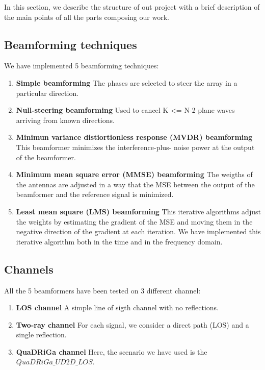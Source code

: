 In this section, we describe the structure of out project with a brief description of 
the main points of all the parts composing our work.

\subsection{Beamforming techniques}

We have implemented 5 beamforming techniques:

\begin{enumerate}
    \item \textbf{Simple beamforming} The phases are selected to steer the array in a particular direction.
    \item \textbf{Null-steering beamforming} Used to cancel K <= N-2 plane waves arriving from known directions.
    \item \textbf{Minimun variance distiortionless response (MVDR) beamforming} This beamformer minimizes the interference-plus-
            noise power at the output of the beamformer. 
    \item \textbf{Minimum mean square error (MMSE) beamforming} The weigths of the antennas are adjusted in a way that the
            MSE between the output of the beamformer and the reference signal is minimized.
    \item \textbf{Least mean square (LMS) beamforming} This iterative algorithms adjust the weights by estimating the
            gradient of the MSE and moving them in the negative direction of the gradient at each iteration. We have 
            implemented this iterative algorithm both in the time and in the frequency domain.
\end{enumerate}

\subsection{Channels}

All the 5 beamformers have been tested on 3 different channel:

\begin{enumerate}
    \item \textbf{LOS channel} A simple line of sigth channel with no reflections.
    \item \textbf{Two-ray channel} For each signal, we consider a direct path (LOS) and a single reflection.
    \item \textbf{QuaDRiGa channel} Here, the scenario we have used is the $QuaDRiGa\_UD2D\_LOS$.
\end{enumerate}

